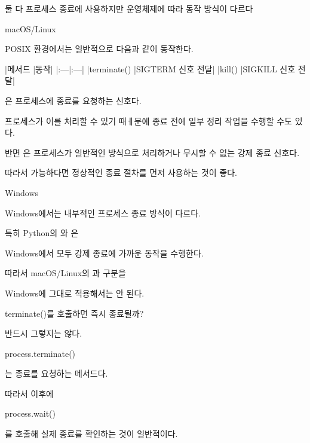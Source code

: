 둘 다 프로세스 종료에 사용하지만 운영체제에 따라 동작 방식이 다르다

\begin{dhksmry}[centered]
macOS/Linux
\end{dhksmry}

POSIX 환경에서는 일반적으로 다음과 같이 동작한다.

\begin{dhktable}
|메서드	|동작|
|:---|:---|
|terminate()	|SIGTERM 신호 전달|
|kill()	|SIGKILL 신호 전달|
\end{dhktable}

은 프로세스에 종료를 요청하는 신호다.

프로세스가 이를 처리할 수 있기 때ㅔ문에 종료 전에 일부 정리 작업을 수행할 수도 있다.

반면 은 프로세스가 일반적인 방식으로 처리하거나 무시할 수 없는 강제 종료 신호다.

따라서 가능하다면 정상적인 종료 절차를 먼저 사용하는 것이 좋다.

\begin{dhksmry}[centered]
Windows
\end{dhksmry}

Windows에서는 내부적인 프로세스 종료 방식이 다르다.

특히 Python의 와 은

Windows에서 모두 강제 종료에 가까운 동작을 수행한다.

따라서 macOS/Linux의 과  구분을

Windows에 그대로 적용해서는 안 된다.

\begin{dhknote}
\begin{dhksmry}[centered]
terminate()를 호출하면 즉시 종료될까?
\end{dhksmry}
\end{dhknote}

반드시 그렇지는 않다.

\begin{dhkzsh}
process.terminate()
\end{dhkzsh}

는 종료를 요청하는 메서드다.

따라서 이후에

\begin{dhkzsh}
process.wait()
\end{dhkzsh}

를 호출해 실제 종료를 확인하는 것이 일반적이다.

